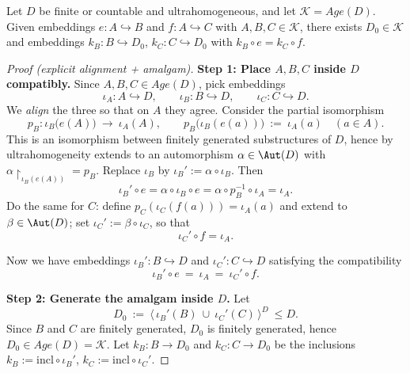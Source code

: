 \begin{mynote}
    \begin{theorem}
        Let $D$ be finite or countable and ultrahomogeneous, and let $\mathcal K= Age(D)$.
        Given embeddings $e\colon A\hookrightarrow B$ and $f\colon A\hookrightarrow C$ with
        $A,B,C\in\mathcal K$, there exists $D_0\in\mathcal K$ and embeddings
        $k_B\colon B\hookrightarrow D_0$, $k_C\colon C\hookrightarrow D_0$ with
        $k_B\circ e = k_C\circ f$.
    \end{theorem}

    \begin{proof}[Proof (explicit alignment + amalgam)]
        \textbf{Step 1: Place $A,B,C$ inside $D$ compatibly.}
        Since $A,B,C\in Age(D)$, pick embeddings
        \[
            \iota_A\colon A\hookrightarrow D,\qquad
            \iota_B\colon B\hookrightarrow D,\qquad
            \iota_C\colon C\hookrightarrow D.
        \]
        We \emph{align} the three so that on $A$ they agree. Consider the partial isomorphism
        \[
            p_B\colon \iota_B\big(e(A)\big)\ \to\ \iota_A(A),\qquad
            p_B\big(\iota_B(e(a))\big)\ :=\ \iota_A(a)\quad(a\in A).
        \]
        This is an isomorphism between finitely generated substructures of $D$, hence by
        ultrahomogeneity extends to an automorphism $\alpha\in\Aut(D)$ with
        $\alpha\!\upharpoonright_{\iota_B(e(A))}=p_B$. Replace $\iota_B$ by
        $\iota_B':=\alpha\circ \iota_B$. Then
        \[
            \iota_B'\circ e = \alpha\circ \iota_B\circ e = \alpha\circ p_B^{-1}\circ \iota_A = \iota_A.
        \]
        Do the same for $C$: define $p_C(\iota_C(f(a)))=\iota_A(a)$ and extend to
        $\beta\in\Aut(D)$; set $\iota_C':=\beta\circ \iota_C$, so that
        \[
            \iota_C'\circ f=\iota_A.
        \]

        Now we have embeddings $\iota_B'\colon B\hookrightarrow D$ and
        $\iota_C'\colon C\hookrightarrow D$ satisfying the compatibility
        \[
            \iota_B'\circ e\ =\ \iota_A\ =\ \iota_C'\circ f.\tag{$\ast$}
        \]

        \textbf{Step 2: Generate the amalgam inside $D$.}
        Let
        \[
            D_0 \ :=\ \langle\, \iota_B'(B)\ \cup\ \iota_C'(C)\,\rangle^D\ \le D.
        \]
        Since $B$ and $C$ are finitely generated, $D_0$ is finitely generated, hence
        $D_0\in Age(D)=\mathcal K$. Let $k_B\colon B\to D_0$ and $k_C\colon C\to D_0$
        be the inclusions $k_B:=\mathrm{incl}\circ \iota_B'$, $k_C:=\mathrm{incl}\circ \iota_C'$.


\end{proof}
\end{mynote}
